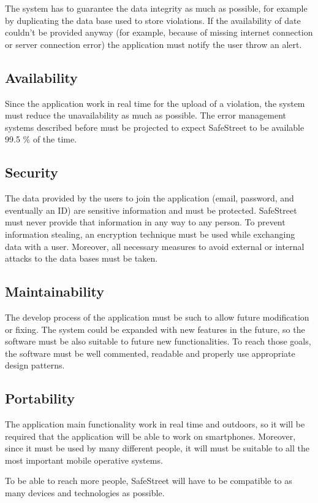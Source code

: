 \documentclass[../RASD.tex]{subfiles}
\begin{document}
    The system has to guarantee the data integrity as much as possible, for example by duplicating the data base used to store violations. If the availability of date couldn’t be provided anyway (for example, because of missing internet connection or server connection error) the application must notify the user throw an alert.
    \subsection{Availability}\label{subsec:availability}
    Since the application work in real time for the upload of a violation, the system must reduce the unavailability as much as possible. The error management systems described before must be projected to expect SafeStreet to be available 99.5 \% of the time.
            \subsection{Security}\label{subsec:security}
    The data provided by the users to join the application (email, password, and eventually an ID) are sensitive information and must be protected. SafeStreet must never provide that information in any way to any person. To prevent information stealing, an encryption technique must be used while exchanging data with a user. Moreover, all necessary measures to avoid external or internal attacks to the data bases must be taken.
    \subsection{Maintainability}\label{subsec:maintainability}
    The develop process of the application must be such to allow future modification or fixing. The system could be expanded with new features in the future, so the software must be also suitable to future new functionalities. To reach those goals, the software must be well commented, readable and properly use appropriate design patterns.
    \subsection{Portability}\label{subsec:portability}
    The application main functionality work in real time and outdoors, so it will be required that the application will be able to work on smartphones. Moreover, since it must be used by many different people, it will must be suitable to all the most important mobile operative systems.

    To be able to reach more people, SafeStreet will have to be compatible to as many devices and technologies as possible.
\end{document}
